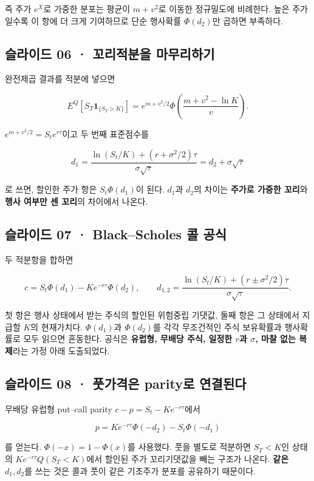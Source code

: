 \documentclass[11pt,a4paper]{article}
\begin{document}
즉 주가 $e^X$로 가중한 분포는 평균이 $m+v^2$로 이동한 정규밀도에 비례한다. 높은 주가일수록 이 항에 더 크게 기여하므로 단순 행사확률 $\Phi(d_2)$만 곱하면 부족하다.\par

\subsection{슬라이드 06 · 꼬리적분을 마무리하기}
완전제곱 결과를 적분에 넣으면\par

\[
E^Q[S_T\mathbf1_{\{S_T>K\}}]
=e^{m+v^2/2}\Phi\!\left(\frac{m+v^2-\ln K}{v}\right).
\]

$e^{m+v^2/2}=S_te^{r\tau}$이고 두 번째 표준점수를\par

\[
d_1=\frac{\ln(S_t/K)+(r+\sigma^2/2)\tau}{\sigma\sqrt\tau}
=d_2+\sigma\sqrt\tau
\]

로 쓰면, 할인한 주가 항은 $S_t\Phi(d_1)$이 된다. $d_1$과 $d_2$의 차이는 \textbf{주가로 가중한 꼬리}와 \textbf{행사 여부만 센 꼬리}의 차이에서 나온다.\par

\subsection{슬라이드 07 · Black–Scholes 콜 공식}
두 적분항을 합하면\par

\[
\boxed{c=S_t\Phi(d_1)-Ke^{-r\tau}\Phi(d_2)},\qquad
d_{1,2}=\frac{\ln(S_t/K)+(r\pm\sigma^2/2)\tau}{\sigma\sqrt\tau}.
\]

첫 항은 행사 상태에서 받는 주식의 할인된 위험중립 기댓값, 둘째 항은 그 상태에서 지급할 $K$의 현재가치다. $\Phi(d_1)$과 $\Phi(d_2)$를 각각 무조건적인 주식 보유확률과 행사확률로 모두 읽으면 혼동한다. 공식은 \textbf{유럽형, 무배당 주식, 일정한 $r$과 $\sigma$, 마찰 없는 복제}라는 가정 아래 도출되었다.\par

\subsection{슬라이드 08 · 풋가격은 parity로 연결된다}
무배당 유럽형 put–call parity $c-p=S_t-Ke^{-r\tau}$에서\par

\[
p=Ke^{-r\tau}\Phi(-d_2)-S_t\Phi(-d_1)
\]

를 얻는다. $\Phi(-x)=1-\Phi(x)$를 사용했다. 풋을 별도로 적분하면 $S_T<K$인 상태의 $Ke^{-r\tau}Q(S_T<K)$에서 할인된 주가 꼬리기댓값을 빼는 구조가 나온다. \textbf{같은 $d_1,d_2$}를 쓰는 것은 콜과 풋이 같은 기초주가 분포를 공유하기 때문이다.\par
\end{document}
